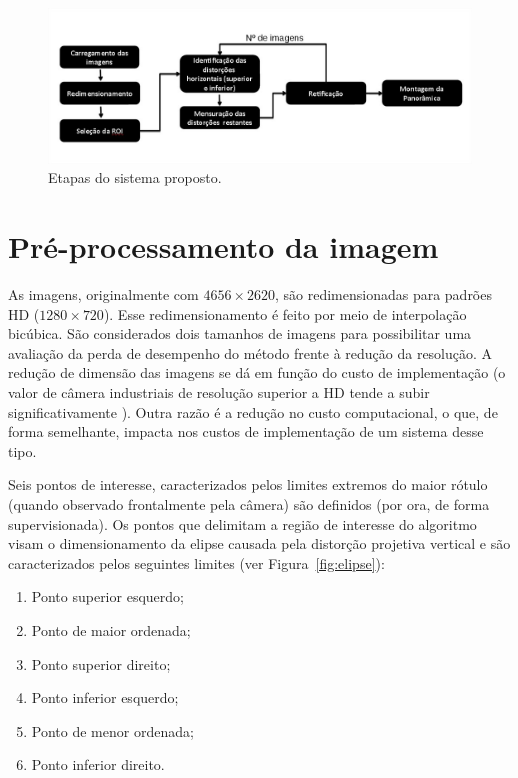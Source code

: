 \begin{figure}[htb]
    \caption{Etapas do sistema proposto.}
    \centering
    \vspace{0.3cm}
    \begin{minipage}{\textwidth}
         \includegraphics[width=\textwidth]{TCC/Imagens/diagrama_alg.jpg}
	\end{minipage}
    \label{fig:diagrama_alg}
\end{figure}

\section{Pré-processamento da imagem}

As imagens, originalmente com $4656 \times 2620$, são redimensionadas para padrões  HD ($1280 \times 720$). Esse redimensionamento é feito por meio de interpolação bicúbica. São considerados dois tamanhos de imagens para possibilitar uma avaliação da perda de desempenho do método frente à redução da resolução. A redução de dimensão das imagens se dá em função do custo de implementação (o valor de câmera industriais de resolução superior a HD tende a subir significativamente \cite{Webb:2003, Shereena:2015}). Outra razão é a redução no custo computacional, o que, de forma semelhante, impacta nos custos de implementação de um sistema desse tipo.

Seis pontos de interesse, caracterizados pelos limites extremos do maior rótulo (quando observado frontalmente pela câmera) são definidos (por ora, de forma supervisionada). Os pontos que delimitam a região de interesse do algoritmo visam o dimensionamento da elipse causada pela distorção projetiva vertical e são caracterizados pelos seguintes limites (ver Figura~\ref{fig:elipse}):

\begin{enumerate}[label=\arabic*)]
	\item Ponto superior esquerdo;
	\item Ponto de maior ordenada;
	\item Ponto superior direito;
	\item Ponto inferior esquerdo;
	\item Ponto de menor ordenada;
	\item Ponto inferior direito.
\end{enumerate}

